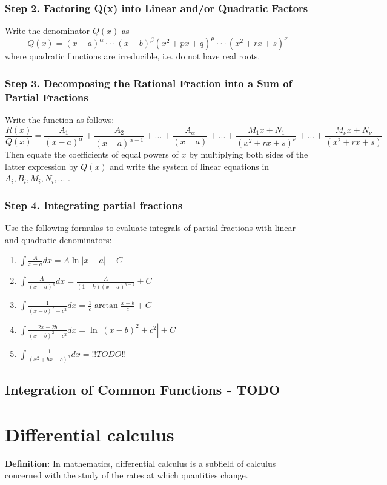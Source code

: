\subsubsection{Step 2. Factoring Q(x) into Linear and/or Quadratic Factors}
Write the denominator $Q(x)$ as
\[
Q(x) = (x-a)^\alpha \cdot\cdot\cdot (x-b)^\beta(x^2+px+q)^\mu \cdot\cdot\cdot (x^2+rx+s)^\nu
\]
where quadratic functions are irreducible, i.e. do not have real roots.

\subsubsection{Step 3. Decomposing the Rational Fraction into a Sum of Partial Fractions}
Write the function as follows:
\[\frac{R(x)}{Q(x)}= \frac{A_1}{(x-a)^{\alpha}} + \frac{A_2}{(x-a)^{\alpha-1}} + ... + \frac{A_\alpha}{(x-a)} + ... + \frac{M_1 x + N_1}{(x^2+rx+s)^{\nu}} + ... + \frac{M_\nu x + N_\nu}{(x^2+rx+s)}\]
Then equate the coefficients of equal powers of $x$ by multiplying both sides of the latter expression by $Q(x)$ and write the system of linear equations in $A_i,B_i,M_i,N_i,...$ .

\subsubsection{Step 4. Integrating partial fractions}
Use the following formulas to evaluate integrals of partial fractions with linear and quadratic denominators:

\begin{enumerate}
	\item $\displaystyle \int \frac{A}{x-a} dx = A \ln \left| x-a \right| +C$

	\item $\displaystyle \int \frac{A}{(x-a)^k} dx = \frac{A}{(1-k)(x-a)^{k-1}} +C$
	
	\item $\displaystyle \int \frac{1}{(x-b)^2+c^2} dx = \frac{1}{c} \arctan \frac{x-b}{c} + C$
	
	\item $\displaystyle \int \frac{2x-2b}{(x-b)^2+c^2} dx = \ln \left| (x-b)^2 + c^2 \right| +C$
	
	\item $\displaystyle \int \frac{1}{(x^2+bx+c)^n} dx = !!TODO!!$
	
\end{enumerate}


\subsection{Integration of Common Functions - TODO}

\section{Differential calculus}
\textbf{Definition:} In mathematics, differential calculus is a subfield of calculus concerned with the study of the rates at which quantities change.

